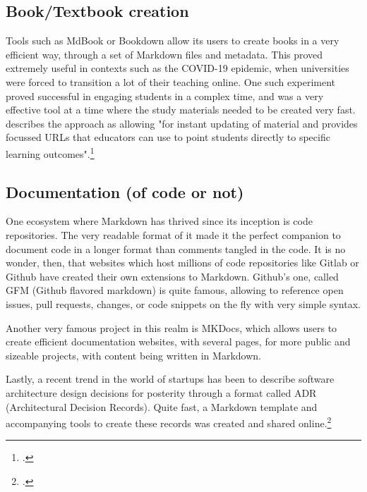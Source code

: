 \subsection{Book/Textbook creation}

Tools such as MdBook or Bookdown allow its users to create books in a very efficient way, through a set of Markdown files and metadata.
This proved extremely useful in contexts such as the COVID-19 epidemic, when universities were forced to transition a lot of their teaching
online. One such experiment proved successful in engaging students in a complex time, and was a very effective tool at a time where the study
materials needed to be created very fast. \citeauthor{dunn2022your} describes the approach as allowing "for instant updating of material and 
provides focussed URLs that educators can use to point students directly to specific learning outcomes".\footcite{dunn2022your}

\subsection{Documentation (of code or not)}

One ecosystem where Markdown has thrived since its inception is code repositories. The very readable format of it made it the perfect companion
to document code in a longer format than comments tangled in the code. It is no wonder, then, that websites which host millions of code repositories
like Gitlab or Github have created their own extensions to Markdown. Github's one, called GFM (Github flavored markdown) is quite famous, allowing
to reference open issues, pull requests, changes, or code snippets on the fly with very simple syntax.\newline

Another very famous project in this realm is MKDocs, which allows users to create efficient documentation websites, with several pages, for more public
and sizeable projects, with content being written in Markdown.\newline

Lastly, a recent trend in the world of startups has been to describe software architecture design decisions for posterity through a format called ADR
(Architectural Decision Records). Quite fast, a Markdown template and accompanying tools to create these records was created and
shared online.\footcite{kopp2018markdown}